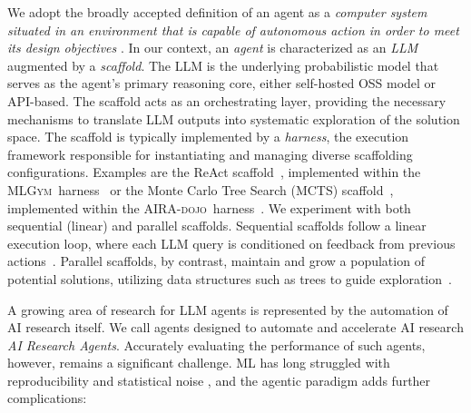 \documentclass{fairmeta}
\newcommand{\airsbench}{\textsc{AIRS-Bench}}
\newcommand{\airadojo}{\textsc{AIRA-dojo}}
\newcommand{\mlgym}{\textsc{MLGym}}
\begin{document}

We adopt the broadly accepted definition of an agent as a \textit{computer system situated in an environment that is capable of autonomous action in order to meet its design objectives} \citep{WoJe95}. In our context, an \textit{agent} is characterized as an \textit{LLM} augmented by a \textit{scaffold}. The LLM is the underlying probabilistic model that serves as the agent's primary reasoning core, either self-hosted OSS model or API-based. The scaffold acts as an orchestrating layer, providing the necessary mechanisms to translate LLM outputs into systematic exploration of the solution space. The scaffold is typically implemented by a \textit{harness}, the execution framework responsible for instantiating and managing diverse scaffolding configurations. Examples are the ReAct scaffold~\citep{yao2023react}, implemented within the \mlgym~harness~\citep{nathani2025mlgym} or the Monte Carlo Tree Search (MCTS) scaffold~\citep{Kocsis2006}, implemented within the \airadojo~harness~\citep{toledo2025airesearchagentsmachine}. We experiment with both sequential (linear) and parallel scaffolds. Sequential scaffolds follow a linear execution loop, where each LLM query is conditioned on feedback from previous actions~\citep{yao2023react, nathani2025mlgym}. Parallel scaffolds, by contrast, maintain and grow a population of potential solutions, utilizing data structures such as trees to guide exploration~\citep{novikov2025alphaevolvecodingagentscientific,openevolve,toledo2025airesearchagentsmachine}.

A growing area of research for LLM agents is represented by the automation of AI research itself. We call agents designed to automate and accelerate AI research \textit{AI Research Agents}. %
Accurately evaluating the performance of such agents, however, remains a significant challenge. ML has long struggled with reproducibility and statistical noise \citep{recht2018cifar10classifiersgeneralizecifar10, hardt2025emerging}, and the agentic paradigm adds further complications:
\end{document}

